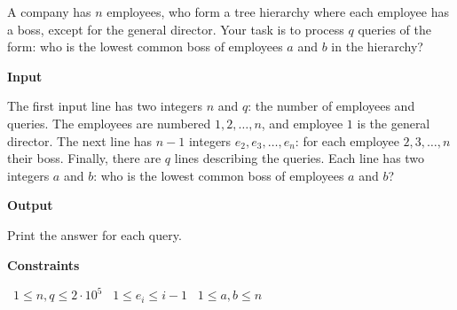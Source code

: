 A company has $n$ employees, who form a tree hierarchy where each employee has a boss, except for the general director.
Your task is to process $q$ queries of the form: who is the lowest common boss of employees $a$ and $b$ in the hierarchy?

\vspace{0.3cm}\noindent\textbf{Input}

The first input line has two integers $n$ and $q$: the number of employees and queries. The employees are numbered $1,2,\dots,n$, and employee $1$ is the general director.
The next line has $n-1$ integers $e_2,e_3,\dots,e_n$: for each employee $2,3,\dots,n$ their boss.
Finally, there are $q$ lines describing the queries. Each line has two integers $a$ and $b$: who is the lowest common boss of employees $a$ and $b$?

\vspace{0.3cm}\noindent\textbf{Output}

Print the answer for each query.

\vspace{0.3cm}\noindent\textbf{Constraints}

\textbullet\ $1 \le n,q \le 2 \cdot 10^5$
\textbullet\ $1 \le e_i \le i-1$
\textbullet\ $1 \le a,b \le n$